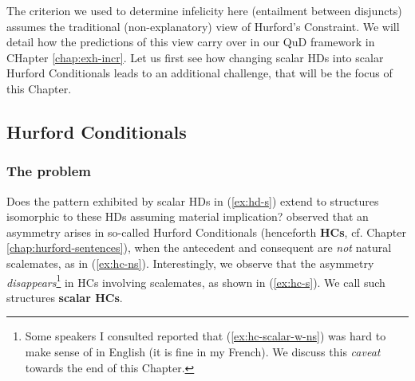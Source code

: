 	
	The criterion we used to determine infelicity here (entailment between disjuncts) assumes the traditional (non-explanatory) view of Hurford's Constraint. We will detail how the predictions of this view carry over in our QuD framework in CHapter \ref{chap:exh-incr}. Let us first see how changing scalar HDs into scalar Hurford Conditionals leads to an additional challenge, that will be the focus of this Chapter.
	
	\subsection{Hurford Conditionals}

	\subsubsection{The problem}
	Does the pattern exhibited by scalar HDs in (\ref{ex:hd-s}) extend to structures isomorphic to these HDs assuming material implication? \citet{Mandelkern2018} observed that an asymmetry arises in so-called Hurford Conditionals (henceforth \textbf{HCs}, cf. Chapter \ref{chap:hurford-sentences}), when the antecedent and consequent are \textit{not} natural scalemates, as in (\ref{ex:hc-ns}). Interestingly, we observe that the asymmetry \textit{disappears}\footnote{Some speakers I consulted reported that (\ref{ex:hc-scalar-w-ns}) was hard to make sense of in English (it is fine in my French). We discuss this \textit{caveat} towards the end of this Chapter.} in HCs involving scalemates, as shown in (\ref{ex:hc-s}). We call such structures \textbf{scalar HCs}.
	
	\begin{exe}
		\ex\label{ex:hc-ns}
		\begin{xlist}
			\label{ex:hc-w-ns}
			\label{ex:hc-ns-w}
		\end{xlist}
	\end{exe}
	
	
	
	\begin{exe}
		\ex\label{ex:hc-s}
		\begin{xlist}
			\label{ex:hc-scalar-w-ns}
			\label{ex:hc-scalar-ns-w}
		\end{xlist}
	\end{exe}

